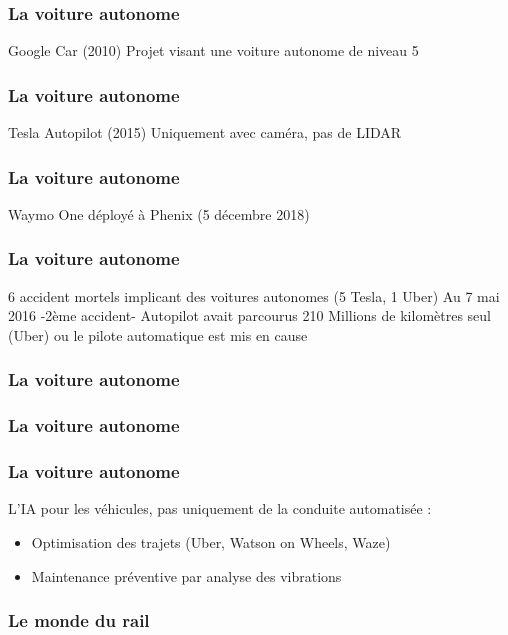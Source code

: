 \begin{frame}
  \frametitle{La voiture autonome}
  Google Car (2010)
  \newline
  Projet visant une voiture autonome de niveau 5
\end{frame}

\begin{frame}
  \frametitle{La voiture autonome}
  Tesla Autopilot (2015)
  \newline
  Uniquement avec caméra, pas de LIDAR
  \newline
\end{frame}

\begin{frame}
  \frametitle{La voiture autonome}
  Waymo One déployé à Phenix (5 décembre 2018)
\end{frame}

\begin{frame}
  \frametitle{La voiture autonome}
  6 accident mortels implicant des voitures autonomes (5 Tesla, 1 Uber)
  \newline
  Au 7 mai 2016 -2ème accident- Autopilot avait parcourus 210 Millions de kilomètres
   seul (Uber) ou le pilote automatique est mis en cause
\end{frame}

\begin{frame}
  \frametitle{La voiture autonome}
\end{frame}

\begin{frame}
  \frametitle{La voiture autonome}
\end{frame}

\begin{frame}
  \frametitle{La voiture autonome}
  L'IA pour les véhicules, pas uniquement de la conduite automatisée :
  \begin{itemize}
  \item Optimisation des trajets (Uber, Watson on Wheels, Waze)
  \item Maintenance préventive par analyse des vibrations
  \end{itemize}
\end{frame}

\begin{frame}
  \frametitle{Le monde du rail}
\end{frame}

